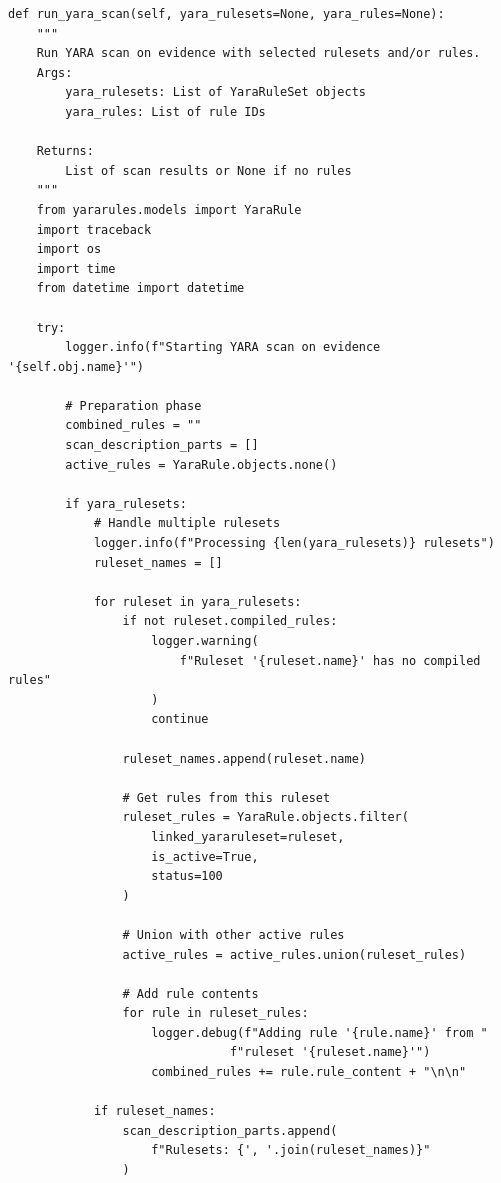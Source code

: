 \begin{verbatim}
def run_yara_scan(self, yara_rulesets=None, yara_rules=None):
    """
    Run YARA scan on evidence with selected rulesets and/or rules.
    Args:
        yara_rulesets: List of YaraRuleSet objects
        yara_rules: List of rule IDs
    
    Returns:
        List of scan results or None if no rules
    """
    from yararules.models import YaraRule
    import traceback
    import os
    import time
    from datetime import datetime
    
    try:
        logger.info(f"Starting YARA scan on evidence '{self.obj.name}'")
        
        # Preparation phase
        combined_rules = ""
        scan_description_parts = []
        active_rules = YaraRule.objects.none()
        
        if yara_rulesets:
            # Handle multiple rulesets
            logger.info(f"Processing {len(yara_rulesets)} rulesets")
            ruleset_names = []
            
            for ruleset in yara_rulesets:
                if not ruleset.compiled_rules:
                    logger.warning(
                        f"Ruleset '{ruleset.name}' has no compiled rules"
                    )
                    continue
                
                ruleset_names.append(ruleset.name)
                
                # Get rules from this ruleset
                ruleset_rules = YaraRule.objects.filter(
                    linked_yararuleset=ruleset,
                    is_active=True,
                    status=100
                )
                
                # Union with other active rules
                active_rules = active_rules.union(ruleset_rules)
                
                # Add rule contents
                for rule in ruleset_rules:
                    logger.debug(f"Adding rule '{rule.name}' from "
                               f"ruleset '{ruleset.name}'")
                    combined_rules += rule.rule_content + "\n\n"
            
            if ruleset_names:
                scan_description_parts.append(
                    f"Rulesets: {', '.join(ruleset_names)}"
                )
                

\end{verbatim}
